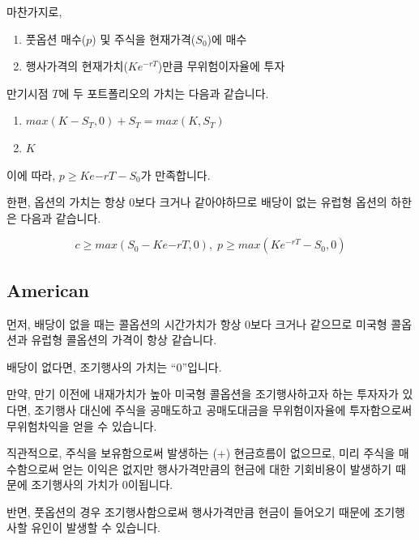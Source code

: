 \documentclass[
  letterpaper,
  DIV=11,
  numbers=noendperiod]{scrreprt}
\providecommand{\tightlist}{%
  \setlength{\itemsep}{0pt}\setlength{\parskip}{0pt}}\usepackage{longtable,booktabs,array}
\begin{document}
마찬가지로,

\begin{enumerate}
\def\labelenumi{\arabic{enumi}.}
\tightlist
\item
  풋옵션 매수(\(p\)) 및 주식을 현재가격(\(S_0\))에 매수
\item
  행사가격의 현재가치(\(Ke^{-rT}\))만큼 무위험이자율에 투자
\end{enumerate}

만기시점 \(T\)에 두 포트폴리오의 가치는 다음과 같습니다.

\begin{enumerate}
\def\labelenumi{\arabic{enumi}.}
\tightlist
\item
  \(max(K-S_T,0)+S_T=max(K,S_T)\)
\item
  \(K\)
\end{enumerate}

이에 따라, \(p\geq Ke{-rT}-S_0\)가 만족합니다.

한편, 옵션의 가치는 항상 0보다 크거나 같아야하므로 배당이 없는 유럽형
옵션의 하한은 다음과 같습니다.

\[c\geq max(S_0-Ke{-rT},0),\;p\geq max(Ke^{-rT}-S_0,0)\]

\subsection*{American}\label{american}

먼저, 배당이 없을 때는 콜옵션의 시간가치가 항상 0보다 크거나 같으므로
미국형 콜옵션과 유럽형 콜옵션의 가격이 항상 같습니다.

\begin{tcolorbox}[enhanced jigsaw, toprule=.15mm, breakable, left=2mm, leftrule=.75mm, opacitybacktitle=0.6, coltitle=black, rightrule=.15mm, colback=white, titlerule=0mm, bottomtitle=1mm, colframe=quarto-callout-tip-color-frame, title=\textcolor{quarto-callout-tip-color}{\faLightbulb}\hspace{0.5em}{Tip}, toptitle=1mm, arc=.35mm, colbacktitle=quarto-callout-tip-color!10!white, opacityback=0, bottomrule=.15mm]

배당이 없다면, 조기행사의 가치는 ``0''입니다.

만약, 만기 이전에 내재가치가 높아 미국형 콜옵션을 조기행사하고자 하는
투자자가 있다면, 조기행사 대신에 주식을 공매도하고 공매도대금을
무위험이자율에 투자함으로써 무위험차익을 얻을 수 있습니다.

직관적으로, 주식을 보유함으로써 발생하는 (+) 현금흐름이 없으므로, 미리
주식을 매수함으로써 얻는 이익은 없지만 행사가격만큼의 현금에 대한
기회비용이 발생하기 때문에 조기행사의 가치가 0이됩니다.

반면, 풋옵션의 경우 조기행사함으로써 행사가격만큼 현금이 들어오기 때문에
조기행사할 유인이 발생할 수 있습니다.

\end{tcolorbox}
\end{document}
